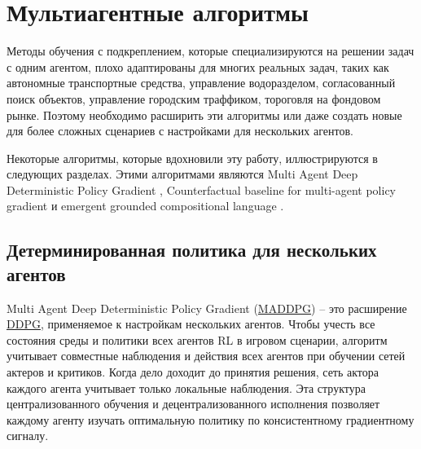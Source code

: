 \section{Мультиагентные алгоритмы} \label{ch2:ma-algs} %

Методы обучения с подкреплением, которые специализируются на решении задач с одним агентом, плохо адаптированы для многих реальных задач, таких как автономные транспортные средства, управление водоразделом, согласованный поиск объектов, управление городским траффиком, тороговля на фондовом рынке. Поэтому необходимо расширить эти алгоритмы или даже создать новые для более сложных сценариев с настройками для нескольких агентов.

Некоторые алгоритмы, которые вдохновили эту работу, иллюстрируются в следующих разделах. Этими алгоритмами являются Multi Agent Deep Deterministic Policy Gradient \cite{lowe2017multiagent}, Counterfactual baseline for multi-agent policy gradient \cite{foerster2017counterfactual} и emergent grounded compositional language \cite{mordatch2017emergence}.

\subsection{Детерминированная политика для нескольких агентов}

Multi Agent Deep Deterministic Policy Gradient (\hyperref[acr:maddpg]{MADDPG}) -- это расширение \hyperref[acr:ddpg]{DDPG}, применяемое к настройкам нескольких агентов. Чтобы учесть все состояния среды и политики всех агентов RL в игровом сценарии, алгоритм учитывает совместные наблюдения и действия всех агентов при обучении сетей актеров и критиков. Когда дело доходит до принятия решения, сеть актора каждого агента учитывает только локальные наблюдения. Эта структура централизованного обучения и децентрализованного исполнения позволяет каждому агенту изучать оптимальную политику по консистентному градиентному сигналу. \cite{lowe2017multiagent}

